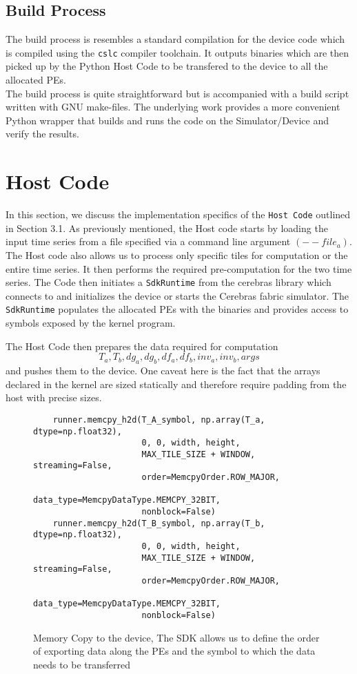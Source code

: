 \subsection{Build Process}

The build process is resembles a standard compilation for the device code which is compiled using the \texttt{cslc} compiler toolchain. It outputs binaries which are then picked up by the Python Host Code to be transfered to the device to all the allocated PEs.\\
The build process is quite straightforward but is accompanied with a build script written with GNU make-files. The underlying work provides a more convenient Python wrapper that builds and runs the code on the Simulator/Device and verify the results.

\clearpage
\section{Host Code}

In this section, we discuss the implementation specifics of the \texttt{Host Code} outlined in Section 3.1. As previously mentioned, the Host code starts by loading the input time series from a file specified via a command line argument $(--file_a)$. The Host code also allows us to process only specific tiles for computation or the entire time series. It then performs the required pre-computation for the two time series. The Code then initiates a \texttt{SdkRuntime} from the cerebras library which connects to and initializes the device or starts the Cerebras fabric simulator. The \texttt{SdkRuntime} populates the allocated PEs with the binaries and provides access to symbols exposed by the kernel program.

The Host Code then prepares the data required for computation \[T_a, T_b, dg_a, dg_b, df_a, df_b, inv_a, inv_b, args\] and pushes them to the device. One caveat here is the fact that the arrays declared in the kernel are sized statically and therefore require padding from the host with precise sizes.

\begin{figure}[!ht]
    \centering
    \begin{verbatim}
    runner.memcpy_h2d(T_A_symbol, np.array(T_a, dtype=np.float32),
                      0, 0, width, height,
                      MAX_TILE_SIZE + WINDOW, streaming=False,
                      order=MemcpyOrder.ROW_MAJOR,
                      data_type=MemcpyDataType.MEMCPY_32BIT,
                      nonblock=False)
    runner.memcpy_h2d(T_B_symbol, np.array(T_b, dtype=np.float32),
                      0, 0, width, height,
                      MAX_TILE_SIZE + WINDOW, streaming=False,
                      order=MemcpyOrder.ROW_MAJOR,
                      data_type=MemcpyDataType.MEMCPY_32BIT,
                      nonblock=False)
\end{verbatim}
\caption{Memory Copy to the device, The SDK allows us to define the order of exporting data along the PEs and the symbol to which the data needs to be transferred}\label{code:memcpy_to}
\end{figure}

